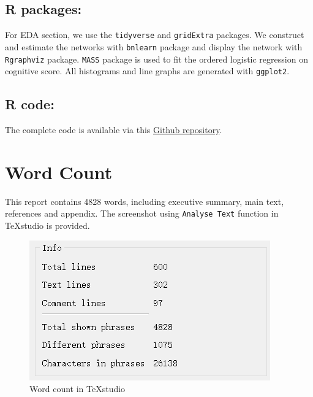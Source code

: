 \documentclass[11pt,twoside]{article}
\numberwithin{Theorem}{section}
\numberwithin{Definition}{section}
\numberwithin{Lemma}{section}
\numberwithin{Algorithm}{section}
\numberwithin{equation}{section}
\begin{document}
\subsection*{R packages:}

For EDA section, we use the \texttt{tidyverse} and \texttt{gridExtra} packages. We construct and estimate the networks with \texttt{bnlearn} package and display the network with \texttt{Rgraphviz} package. \texttt{MASS} package is used to fit the ordered logistic regression on cognitive score. All histograms and line graphs are generated with \texttt{ggplot2}.

\subsection*{R code: }
The complete code is available via this \href{https://github.com/Shi-Yile/Project-1-Dementia-Risk-Factors.git}{Github repository}.

\clearpage

\section*{Word Count}

This report contains 4828 words, including executive summary, main text, references and appendix. The screenshot using  \texttt{Analyse Text} function in TeXstudio is provided.

\begin{figure}[!h]
	\centering
	\includegraphics{Images/word_count.png}
	\caption{Word count in TeXstudio}
\end{figure}
\end{document}
